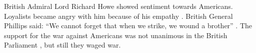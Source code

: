 British Admiral Lord Richard Howe showed sentiment towards Americans. Loyalists
became angry with him because of his empathy \cite[p.60]{stephenson_patriot_2007}.  British
General Phillips said: “We cannot forget that when we strike, we wound a
brother” \cite[p.547]{mackesy1962british}.  The support for the war against Americans was not
unanimous in the British Parliament \cite[p.16]{pearson_failure_}, but still they waged war.




%
%
%
%
%
%
%
%
%
%
%
